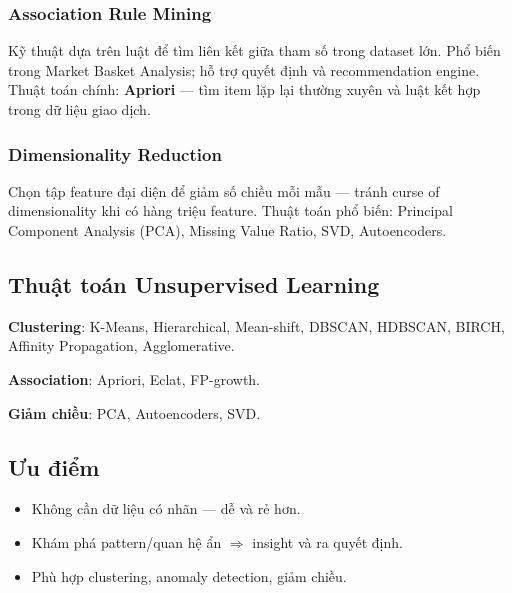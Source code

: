 \subsubsection{Association Rule Mining}

\begin{ynghia}[title={Association}]
Kỹ thuật dựa trên luật để tìm liên kết giữa tham số trong dataset lớn.
Phổ biến trong Market Basket Analysis; hỗ trợ quyết định và recommendation engine.
Thuật toán chính: \textbf{Apriori} --- tìm item lặp lại thường xuyên và luật kết hợp trong dữ liệu giao dịch.
\end{ynghia}

\subsubsection{Dimensionality Reduction}

\begin{ynghia}[title={Giảm chiều}]
Chọn tập feature đại diện để giảm số chiều mỗi mẫu --- tránh curse of dimensionality khi có hàng triệu feature.
Thuật toán phổ biến: Principal Component Analysis (PCA), Missing Value Ratio, SVD, Autoencoders.
\end{ynghia}

\subsection{Thuật toán Unsupervised Learning}

\begin{phuongphap}[title={Danh sách thường dùng}]
\textbf{Clustering}: K-Means, Hierarchical, Mean-shift, DBSCAN, HDBSCAN, BIRCH, Affinity Propagation, Agglomerative.

\textbf{Association}: Apriori, Eclat, FP-growth.

\textbf{Giảm chiều}: PCA, Autoencoders, SVD.
\end{phuongphap}

\subsection{Ưu điểm}

\begin{tinhchat}[title={Ưu điểm}]
\begin{itemize}
  \item Không cần dữ liệu có nhãn --- dễ và rẻ hơn.
  \item Khám phá pattern/quan hệ ẩn $\Rightarrow$ insight và ra quyết định.
  \item Phù hợp clustering, anomaly detection, giảm chiều.
\end{itemize}
\end{tinhchat}

